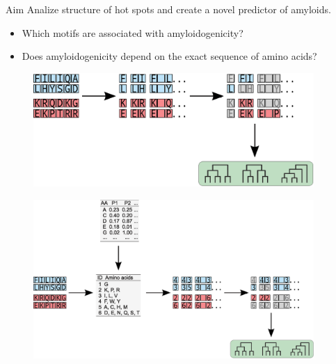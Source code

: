 \documentclass{beamer}\usepackage[]{graphicx}\usepackage[]{color}
\begin{document}
  \begin{frame}{Aim}
  Analize structure of hot spots and create a novel predictor of amyloids.
  \begin{itemize}
  \item Which motifs are associated with amyloidogenicity?
  \item Does amyloidogenicity depend on the exact sequence of amino acids?
  \end{itemize}
  \end{frame}

    \begin{frame}{}
\begin{figure} 
\includegraphics[width=0.95\textwidth]{static_figure/ngram1.eps}
\end{figure}
  \end{frame}
  
    \begin{frame}{}
\begin{figure} 
\includegraphics[width=0.95\textwidth]{static_figure/ngram2.eps}
\end{figure}
  \end{frame}
\end{document}
